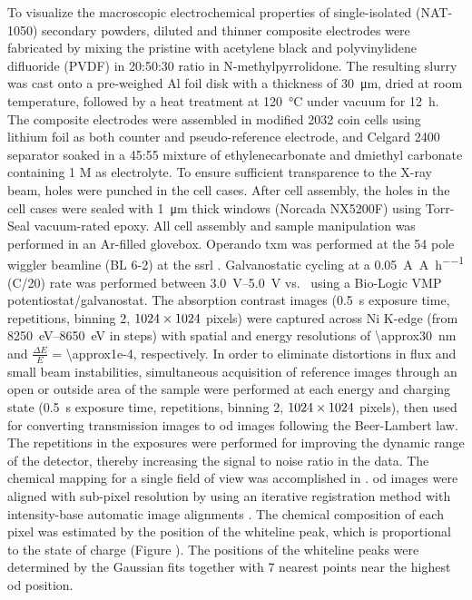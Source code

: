 \documentclass{article}
\begin{document}
To visualize the macroscopic electrochemical properties of
single-isolated \nca{} (NAT-1050) secondary powders, diluted and
thinner composite electrodes were fabricated by mixing the pristine
\nca{} with acetylene black and polyvinylidene difluoride (PVDF) in
20:50:30 ratio in N-methylpyrrolidone. The resulting slurry was cast
onto a pre-weighed Al foil disk with a thickness of
\SI{30}{\micro\meter}, dried at room temperature, followed by a heat
treatment at \SI{120}{\celsius} under vacuum for \SI{12}{\hour}. The
composite electrodes were assembled in  modified
2032 coin cells using lithium foil as both counter and
pseudo-reference electrode, and Celgard 2400 separator soaked in a
45:55 mixture of ethylenecarbonate and dmiethyl carbonate containing 1
M  as electrolyte. To ensure sufficient transparence to the
X-ray beam, holes were punched in the cell cases. After cell assembly,
the holes in the cell cases were sealed with \SI{1}{\micro\meter}
thick  windows (Norcada NX5200F) using Torr-Seal
vacuum-rated epoxy. All cell assembly and sample manipulation was
performed in an Ar-filled glovebox. Operando \gls{txm} was performed
at the 54 pole wiggler beamline (BL 6-2) at the \gls{ssrl}
\cite{yun2008}. Galvanostatic cycling at a
\SI{0.05}{\ampere\per\ampere\per\hour} (C/20) rate was performed
between \SIrange{3.0}{5.0}{\volt} vs.\  using a Bio-Logic
VMP potentiostat/galvanostat. The absorption contrast images
(\SI{0.5}{\second} exposure time,  repetitions,
binning 2, $\rm 1024\times 1024$ pixels) were captured across Ni
K-edge (from \SIrange{8250}{8650}{\electronvolt} in  steps) with spatial and energy resolutions of
\SI{\approx30}{\nano\meter} and $\frac{\Delta E}{E}$ =
\num{\approx1e-4}, respectively. In order to eliminate distortions in
flux and small beam instabilities, simultaneous acquisition of
reference images through an open or outside area of the sample were
performed at each energy and charging state (\SI{0.5}{\second}
exposure time,  repetitions, binning 2, $\rm 1024
\times 1024$ pixels), then used for converting transmission images to
\gls{od} images following the Beer-Lambert law. The repetitions in the
exposures were performed for improving the dynamic range of the
detector, thereby increasing the signal to noise ratio in the
data. The chemical mapping for a single field of view was accomplished
in . \Gls{od} images were aligned with
sub-pixel resolution by using an iterative registration method with
intensity-base automatic image alignments \cite{lee2019-3}. The
chemical composition of each pixel was estimated by the position of
the whiteline peak, which is proportional to the state of charge
(Figure ). The positions of the
whiteline peaks were determined by the Gaussian fits together with 7
nearest points near the highest \gls{od} position.
\end{document}
